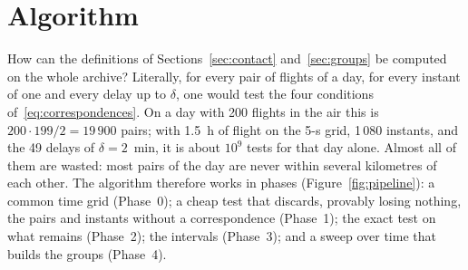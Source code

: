 \section{Algorithm}\label{sec:algorithm}

\algrenewcommand{}
\algrenewcommand{}

How can the definitions of Sections~\ref{sec:contact} and~\ref{sec:groups} be computed on the
whole archive? Literally, for every pair of flights of a day, for every instant of one and every
delay up to $\delta$, one would test the four conditions of~\eqref{eq:correspondences}. On a day
with 200 flights in the air this is $200\cdot199/2=19\,900$ pairs; with 1.5~h of flight on the
5-s grid, 1\,080 instants, and the 49 delays of $\delta=2$~min, it is about $10^9$ tests for that
day alone. Almost all of them are wasted: most pairs of the day are never within several
kilometres of each other. The algorithm therefore works in phases (Figure~\ref{fig:pipeline}): a
common time grid (Phase~0); a cheap test that discards, provably losing nothing, the pairs and
instants without a correspondence (Phase~1); the exact test on what remains (Phase~2); the
intervals (Phase~3); and a sweep over time that builds the groups (Phase~4).

